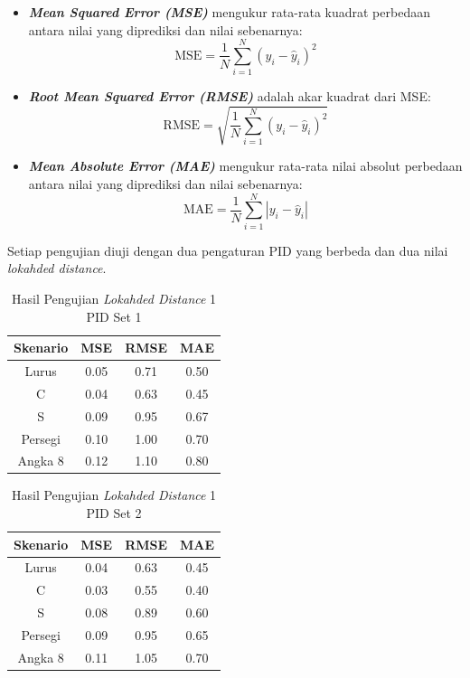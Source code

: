   \begin{itemize}
      \item \textbf{\emph{Mean Squared Error (MSE)}} mengukur rata-rata kuadrat perbedaan antara nilai yang diprediksi dan nilai sebenarnya:
      \[
      \text{MSE} = \frac{1}{N} \sum_{i=1}^{N} (y_i - \hat{y}_i)^2
      \]
      
      \item \textbf{\emph{Root Mean Squared Error (RMSE)}} adalah akar kuadrat dari MSE:
      \[
      \text{RMSE} = \sqrt{\frac{1}{N} \sum_{i=1}^{N} (y_i - \hat{y}_i)^2}
      \]
      
      \item \textbf{\emph{Mean Absolute Error (MAE)}} mengukur rata-rata nilai absolut perbedaan antara nilai yang diprediksi dan nilai sebenarnya:
      \[
      \text{MAE} = \frac{1}{N} \sum_{i=1}^{N} |y_i - \hat{y}_i|
      \]
  \end{itemize}
  
  Setiap pengujian diuji dengan dua pengaturan PID yang berbeda dan dua nilai \emph{lokahded distance}.
  \begin{table}[H]
    \centering
    \caption{Hasil Pengujian \emph{Lokahded Distance} 1 PID Set 1}
    \label{tab:hasil_lokahded_distance_1_pid_set_1}
    \begin{tabular}{|c|c|c|c|}
    \hline
    \textbf{Skenario} & \textbf{MSE} & \textbf{RMSE} & \textbf{MAE} \\ \hline
    Lurus          & 0.05  & 0.71  & 0.50  \\
    C              & 0.04  & 0.63  & 0.45  \\
    S              & 0.09  & 0.95  & 0.67  \\
    Persegi        & 0.10  & 1.00  & 0.70  \\
    Angka 8        & 0.12  & 1.10  & 0.80  \\
    \hline
    \end{tabular}
    \end{table}
    
    \begin{table}[H]
    \centering
    \caption{Hasil Pengujian \emph{Lokahded Distance} 1 PID Set 2}
    \label{tab:hasil_lokahded_distance_1_pid_set_2}
    \begin{tabular}{|c|c|c|c|}
    \hline
    \textbf{Skenario} & \textbf{MSE} & \textbf{RMSE} & \textbf{MAE} \\ \hline
    Lurus          & 0.04  & 0.63  & 0.45  \\
    C              & 0.03  & 0.55  & 0.40  \\
    S              & 0.08  & 0.89  & 0.60  \\
    Persegi        & 0.09  & 0.95  & 0.65  \\
    Angka 8        & 0.11  & 1.05  & 0.70  \\
    \hline
    \end{tabular}
    \end{table}
    
